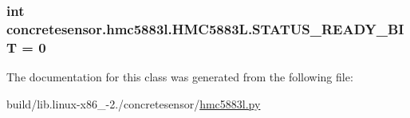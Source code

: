 \subsubsection[{S\+T\+A\+T\+U\+S\+\_\+\+R\+E\+A\+D\+Y\+\_\+\+B\+I\+T}]{\setlength{\rightskip}{0pt plus 5cm}int concretesensor.\+hmc5883l.\+H\+M\+C5883\+L.\+S\+T\+A\+T\+U\+S\+\_\+\+R\+E\+A\+D\+Y\+\_\+\+B\+I\+T = 0\hspace{0.3cm}{\ttfamily [static]}}\label{classconcretesensor_1_1hmc5883l_1_1HMC5883L_a713737acb08d81e867515ea9eb4465d1}


The documentation for this class was generated from the following file\+:\begin{DoxyCompactItemize}
\item 
build/lib.\+linux-\/x86\+\_-\/2./concretesensor/\hyperlink{build_2lib_8linux-x86__64-2_87_2concretesensor_2hmc5883l_8py}{hmc5883l.\+py}\end{DoxyCompactItemize}
